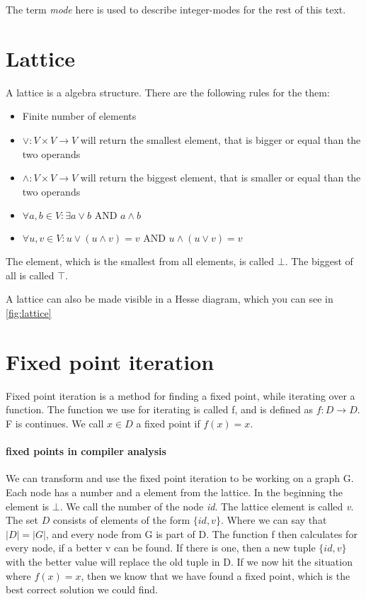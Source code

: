 The term \textit{mode} here is used to describe integer-modes for the rest of this text.

\section{Lattice}
A lattice is a algebra structure. There are the following rules for the them:
\begin{itemize}
	\item Finite number of elements
	\item $\vee: V \times V \rightarrow V$ will return the smallest element, that is bigger or equal than the two operands
	\item $\wedge: V \times V \rightarrow V$ will return the biggest element, that is smaller or equal than the two operands
	\item $\forall a,b \in V : \exists a \vee b \text{ AND } a \wedge b$
	\item $\forall u,v \in V : u \vee ( u \wedge v) = v \text{ AND } u \wedge ( u \vee v ) = v$
\end{itemize}

The element, which is the smallest from all elements, is called $\bot$. The biggest of all is called $\top$.

A lattice can also be made visible in a Hesse diagram, which you can see in \autoref{fig:lattice}

\section{Fixed point iteration}

Fixed point iteration is a method for finding a fixed point, while iterating over a function. \newline
The function we use for iterating is called f, and is defined as $f: D \rightarrow D$. F is continues. We call $x \in D$ a fixed point if $f(x)=x$.

\paragraph{fixed points in compiler analysis}
We can transform and use the fixed point iteration to be working on a graph G. Each node has a number and a element from the lattice. In the beginning the element is $\bot$. We call the number of the node \textit{id}. The lattice element is called \textit{v}.
The set $D$ consists of elements of the form $\{id, v\}$. Where we can say that $|D| = |G|$, and every node from G is part of D.
The function f then calculates for every node, if a better v can be found. If there is one, then a new tuple $\{id, v\}$ with the better value will replace the old tuple in D.
If we now hit the situation where $f(x) = x$, then we know that we have found a fixed point, which is the best correct solution we could find.